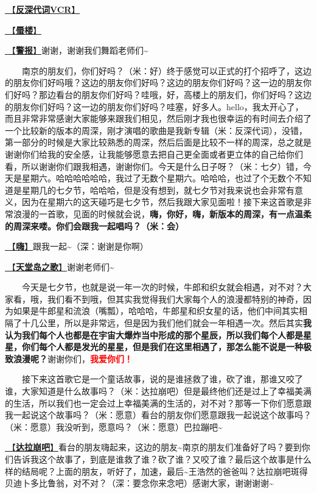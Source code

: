 \documentclass[]{ctexbook}
\begin{document}
\hyperref[senself-vcr]{🎥【\textbf{反深代词VCR}】}

\hyperref[mirage]{🎵【\textbf{蜃楼}】}

\hyperref[the-giver]{🎵【\textbf{警报}】}谢谢，谢谢我们舞蹈老师们\textasciitilde{}

  南京的朋友们，你们好吗？（米：好）终于感觉可以正式的打个招呼了，这边的朋友你们好吗哦？这边的朋友你们好吗？这边的朋友你们好吗？这一边的朋友你们好吗？那边看台的朋友你们好吗？哇哦，好，高楼上的朋友们，你们好吗？这边的朋友你们好吗？这一边的朋友你们好吗？哇塞，好多人。hello，我太开心了，而且非常非常感谢大家能够来跟我们相见，然后刚才我也很幸运的有时间去介绍了一个比较新的版本的周深，刚才演唱的歌曲是我新专辑（米：反深代词），没错，第一部分的时候是大家比较熟悉的周深，然后后面是比较不一样的周深，总之就是谢谢你们给我的安全感，让我能够愿意去把自己更全面或者更立体的自己给你们看，所以谢谢你们跟我相遇，谢谢你们。今天是什么日子呀？（米：七夕）错，今天是星期六。哈哈哈哈哈哈，我过了无数个星期六。哈哈哈，也过了个无数个不知道是星期几的七夕节，哈哈哈，但是没有想到，就七夕节对我来说也会非常有意义，因为在星期六的这天碰巧是七夕节，然后我跟大家见面啦！接下来这首歌是非常浪漫的一首歌，见面的时候就会说，\textbf{嗨，你好，嗨，新版本的周深，有一点温柔的周深来喽。你们会跟我一起唱吗？（米：会）}

\hyperref[say-hi]{🎵【\textbf{嗨}】}跟我一起\textasciitilde（深：谢谢是你啊）

\hyperref[haven-song]{🎵【\textbf{天堂岛之歌}】}谢谢老师们\textasciitilde{}

  今天是七夕节，也就是说一年一次的时候，牛郎和织女就会相遇，对不对？大家看，哦，我们看不到哦，但其实我觉得我们大家每个人的浪漫都特别的神奇，因为如果是牛郎星和流浪（嘴瓢），哈哈哈，牛郎星和织女星的话，他们中间其实相隔了十几公里，所以是非常远，但是因为我们他们就会一年相遇一次。然后其实\textbf{我认为我们每个人也都是在宇宙大爆炸当中形成的那个星辰，所以我们每个人都是星星，你们每个人都是发光的星星，但是我们在这里相遇了，那怎么能不说是一种极致浪漫呢？}谢谢你们，\textbf{\textcolor{red}{我爱你们！}}

  接下来这首歌它是一个童话故事，说的是谁拯救了谁，砍了谁，那谁又咬了谁，大家知道是什么故事吗？（米：达拉崩吧）但是最终他们还是过上了幸福美满的生活，所以我们也一定会过上幸福美满的生活的，对不对？那等一下你们愿意跟我一起说这个故事吗？（米：愿意）看台的朋友你们愿意跟我一起说这个故事吗？（米：愿意）我没听到，愿意吗？（米：愿意）巴拉蹦吧\textasciitilde{}

\hyperref[dalabengba]{🎵【\textbf{达拉崩吧}】}看台的朋友嗨起来，这边的朋友\textasciitilde 南京的朋友们准备好了吗？要到你们告诉我这个故事了，到底是谁救了谁？砍了谁？又咬了谁？最后这个故事是什么样的结局呢？上面的朋友，听好了，加速，最后\textasciitilde 王浩然的爸爸叫？达拉崩吧斑得贝迪卜多比鲁翁，对不对？（深：要念你来念吧）感谢大家，谢谢谢谢\textasciitilde{}
\end{document}
